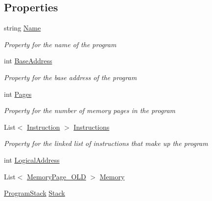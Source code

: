 \subsection*{Properties}
\begin{DoxyCompactItemize}
\item 
string \hyperlink{class_c_p_u___o_s___simulator_1_1_c_p_u_1_1_simulator_program_a29b077a3403773010be9efe912d11b92}{Name}
\begin{DoxyCompactList}\small\item\em Property for the name of the program \end{DoxyCompactList}\item 
int \hyperlink{class_c_p_u___o_s___simulator_1_1_c_p_u_1_1_simulator_program_ad07bee447d47fb07243a4484b5740c21}{Base\+Address}
\begin{DoxyCompactList}\small\item\em Property for the base address of the program \end{DoxyCompactList}\item 
int \hyperlink{class_c_p_u___o_s___simulator_1_1_c_p_u_1_1_simulator_program_aa33b4428956a097dd710948ee51bb5f3}{Pages}
\begin{DoxyCompactList}\small\item\em Property for the number of memory pages in the program \end{DoxyCompactList}\item 
List$<$ \hyperlink{class_c_p_u___o_s___simulator_1_1_c_p_u_1_1_instruction}{Instruction} $>$ \hyperlink{class_c_p_u___o_s___simulator_1_1_c_p_u_1_1_simulator_program_ae64c462081a1806d5f194c271dbb2686}{Instructions}
\begin{DoxyCompactList}\small\item\em Property for the linked list of instructions that make up the program \end{DoxyCompactList}\item 
int \hyperlink{class_c_p_u___o_s___simulator_1_1_c_p_u_1_1_simulator_program_afda25ae1ba65b33787dfc1f9af1c1d8a}{Logical\+Address}
\item 
List$<$ \hyperlink{class_c_p_u___o_s___simulator_1_1_memory_1_1_memory_page___o_l_d}{Memory\+Page\+\_\+\+O\+L\+D} $>$ \hyperlink{class_c_p_u___o_s___simulator_1_1_c_p_u_1_1_simulator_program_a529a2c7d7e4fd209d2f771fe0916c8e6}{Memory}
\item 
\hyperlink{class_c_p_u___o_s___simulator_1_1_c_p_u_1_1_program_stack}{Program\+Stack} \hyperlink{class_c_p_u___o_s___simulator_1_1_c_p_u_1_1_simulator_program_ac6065e57e8d108a0aefd27840f3bf01c}{Stack}
\end{DoxyCompactItemize}

